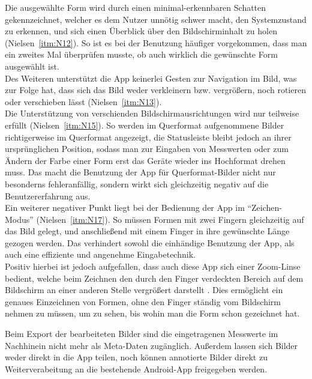 Die ausgewählte Form wird durch einen minimal-erkennbaren Schatten gekennzeichnet, welcher es dem Nutzer unnötig schwer macht, den Systemzustand zu erkennen, und sich einen Überblick über den Bildschirminhalt zu holen (Nielsen~\autoref{itm:N12}).
So ist es bei der Benutzung häufiger vorgekommen, dass man ein zweites Mal überprüfen musste, ob auch wirklich die gewünschte Form ausgewählt ist. \\

Des Weiteren unterstützt die App keinerlei Gesten zur Navigation im Bild, was zur Folge hat, dass sich das Bild weder verkleinern bzw. vergrößern, noch rotieren oder verschieben lässt (Nielsen~\autoref{itm:N13}).  \\

Die Unterstützung von verschienden Bildschirmausrichtungen wird nur teilweise erfüllt (Nielsen~\autoref{itm:N15}).
So werden im Querformat aufgenommene Bilder richtigerweise im Querformat angezeigt, die Statusleiste bleibt jedoch an ihrer ursprünglichen Position, sodass man zur Eingaben von Messwerten oder zum Ändern der Farbe einer Form erst das Geräte wieder ins Hochformat drehen muss.
Das macht die Benutzung der App für Querformat-Bilder nicht nur besonderns fehleranfällig, sondern wirkt sich gleichzeitig negativ auf die Benutzererfahrung aus. \\

Ein weiterer negativer Punkt liegt bei der Bedienung der App im ``Zeichen-Modus'' (Nielsen~\autoref{itm:N17}).
So müssen Formen mit zwei Fingern gleichzeitig auf das Bild gelegt, und anschließend mit einem Finger in ihre gewünschte Länge gezogen werden.
Das verhindert sowohl die einhändige Benutzung der App, als auch eine effiziente und angenehme Eingabetechnik. \\

Positiv hierbei ist jedoch aufgefallen, dass auch diese App sich einer Zoom-Linse bedient, welche beim Zeichnen den durch den Finger verdeckten Bereich auf dem Bildschirm an einer anderen Stelle vergrößert darstellt .
Dies ermöglicht ein genaues Einzeichnen von Formen, ohne den Finger ständig vom Bildschirm nehmen zu müssen, um zu sehen, bis wohin man die Form schon gezeichnet hat.

Beim Export der bearbeiteten Bilder sind die eingetragenen Messwerte im Nachhinein nicht mehr als Meta-Daten zugänglich.
Außerdem lassen sich Bilder weder direkt in die App teilen, noch können annotierte Bilder direkt zu Weiterverabeitung an die bestehende Android-App freigegeben werden. \\

